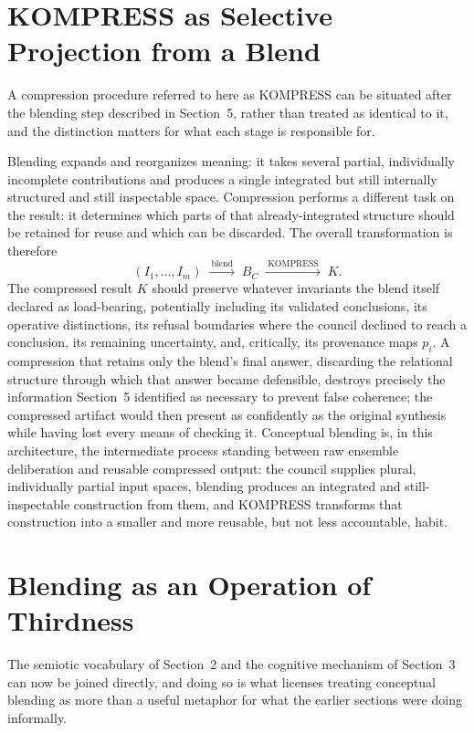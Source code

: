 \documentclass[11pt,openany]{book}
\begin{document}
\section{KOMPRESS as Selective Projection from a Blend}

A compression procedure referred to here as KOMPRESS can be situated after the blending step described in Section~5, rather than treated as identical to it, and the distinction matters for what each stage is responsible for.

Blending expands and reorganizes meaning: it takes several partial, individually incomplete contributions and produces a single integrated but still internally structured and still inspectable space. Compression performs a different task on the result: it determines which parts of that already-integrated structure should be retained for reuse and which can be discarded. The overall transformation is therefore
\[
(I_1, \ldots, I_m) \;\xrightarrow{\ \text{blend}\ }\; B_C \;\xrightarrow{\ \text{KOMPRESS}\ }\; K.
\]
The compressed result $K$ should preserve whatever invariants the blend itself declared as load-bearing, potentially including its validated conclusions, its operative distinctions, its refusal boundaries where the council declined to reach a conclusion, its remaining uncertainty, and, critically, its provenance maps $p_i$. A compression that retains only the blend's final answer, discarding the relational structure through which that answer became defensible, destroys precisely the information Section~5 identified as necessary to prevent false coherence; the compressed artifact would then present as confidently as the original synthesis while having lost every means of checking it. Conceptual blending is, in this architecture, the intermediate process standing between raw ensemble deliberation and reusable compressed output: the council supplies plural, individually partial input spaces, blending produces an integrated and still-inspectable construction from them, and KOMPRESS transforms that construction into a smaller and more reusable, but not less accountable, habit.

\section{Blending as an Operation of Thirdness}

The semiotic vocabulary of Section~2 and the cognitive mechanism of Section~3 can now be joined directly, and doing so is what licenses treating conceptual blending as more than a useful metaphor for what the earlier sections were doing informally.
\end{document}
